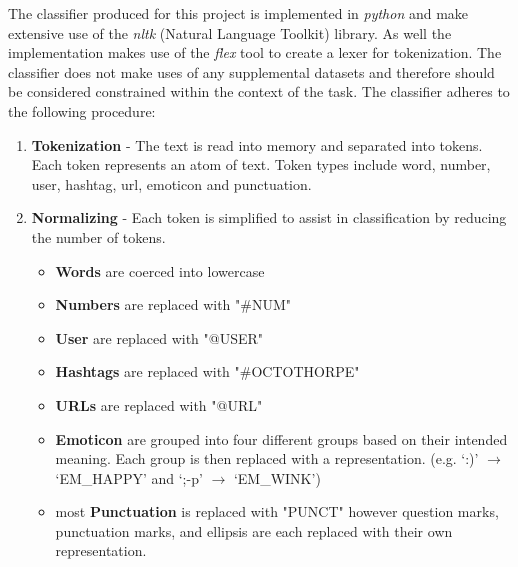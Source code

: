 \documentclass[final,3p,12pt]{elsarticle}
\begin{document}
The classifier produced for this project is implemented in \textit{python} and
make extensive use of the \textit{nltk} (Natural Language Toolkit) library. As
well the implementation makes use of the \textit{flex} tool to create a lexer
for tokenization. The classifier does not make uses of any supplemental
datasets and therefore should be considered constrained within the context of
the task. The classifier adheres to the following procedure:

\begin{enumerate}

    \item \textbf{Tokenization} - The text is read into memory and separated into
        tokens. Each token represents an atom of text. Token types include
        word, number, user, hashtag, url, emoticon and punctuation.

    \item \textbf{Normalizing} - Each token is simplified to assist in
        classification by reducing the number of tokens.

        \begin{itemize}

            \item \textbf{Words} are coerced into lowercase

            \item \textbf{Numbers} are replaced with "\#NUM"

            \item \textbf{User} are replaced with "@USER"

            \item \textbf{Hashtags} are replaced with "\#OCTOTHORPE"

            \item \textbf{URLs} are replaced with "@URL"

            \item \textbf{Emoticon} are grouped into four different groups
                based on their intended meaning. Each group is then replaced
                with a representation. (e.g. `:)' $\rightarrow$ `EM\_HAPPY' and
                `;-p' $\rightarrow$ `EM\_WINK')

            \item most \textbf{Punctuation} is replaced with "PUNCT" however
                question marks, punctuation marks, and ellipsis are each
                replaced with their own representation.

        \end{itemize}


\end{enumerate}
\end{document}
